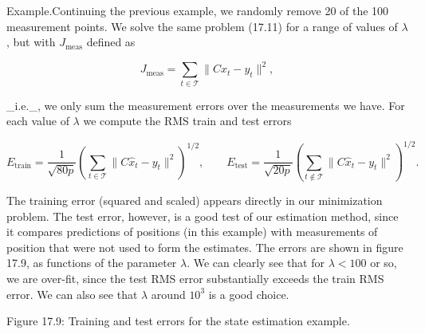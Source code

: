 Example.Continuing the previous example, we randomly remove 20 of the 100 measurement points. We solve the same problem (17.11) for a range of values of \(\lambda\), but with \(J_{\text{meas}}\) defined as

\[J_{\text{meas}}=\sum_{t\in\mathcal{T}}\|Cx_{t}-y_{t}\|^{2},\]

_i.e._, we only sum the measurement errors over the measurements we have. For each value of \(\lambda\) we compute the RMS train and test errors

\[E_{\text{train}}=\frac{1}{\sqrt{80p}}\left(\sum_{t\in\mathcal{T}}\|C\hat{x}_{t }-y_{t}\|^{2}\right)^{1/2},\qquad E_{\text{test}}=\frac{1}{\sqrt{20p}}\left( \sum_{t\notin\mathcal{T}}\|C\hat{x}_{t}-y_{t}\|^{2}\right)^{1/2}.\]

The training error (squared and scaled) appears directly in our minimization problem. The test error, however, is a good test of our estimation method, since it compares predictions of positions (in this example) with measurements of position that were not used to form the estimates. The errors are shown in figure 17.9, as functions of the parameter \(\lambda\). We can clearly see that for \(\lambda<100\) or so, we are over-fit, since the test RMS error substantially exceeds the train RMS error. We can also see that \(\lambda\) around \(10^{3}\) is a good choice.

Figure 17.9: Training and test errors for the state estimation example.

 
